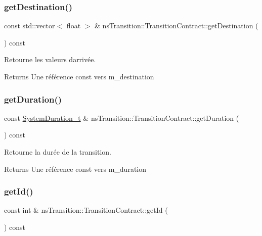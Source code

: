 \subsubsection{\texorpdfstring{get\+Destination()}{getDestination()}}
{\footnotesize\ttfamily const std\+::vector$<$ float $>$ \& ns\+Transition\+::\+Transition\+Contract\+::get\+Destination (\begin{DoxyParamCaption}{ }\end{DoxyParamCaption}) const}



Retourne les valeurs d\textquotesingle{}arrivée. 

\begin{DoxyReturn}{Returns}
Une référence const vers m\+\_\+destination 
\end{DoxyReturn}
\mbox{\label{classns_transition_1_1_transition_contract_a9b900986c8f271729f99c88fa1b0a5e1}} 
\subsubsection{\texorpdfstring{get\+Duration()}{getDuration()}}
{\footnotesize\ttfamily const \hyperlink{namespacens_transition_a260258f249f46ff9a62da721537f87af}{System\+Duration\+\_\+t} \& ns\+Transition\+::\+Transition\+Contract\+::get\+Duration (\begin{DoxyParamCaption}{ }\end{DoxyParamCaption}) const}



Retourne la durée de la transition. 

\begin{DoxyReturn}{Returns}
Une référence const vers m\+\_\+duration 
\end{DoxyReturn}
\mbox{\label{classns_transition_1_1_transition_contract_a34a594d05171628bca81120c768c86b9}} 
\subsubsection{\texorpdfstring{get\+Id()}{getId()}}
{\footnotesize\ttfamily const int \& ns\+Transition\+::\+Transition\+Contract\+::get\+Id (\begin{DoxyParamCaption}{ }\end{DoxyParamCaption}) const}



